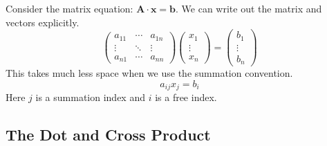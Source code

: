 \begin{Example}
Consider the matrix equation: $\mathbf{A} \cdot \mathbf{x} = \mathbf{b}$.
We can write out the matrix and vectors explicitly.
\[
\begin{pmatrix}
a_{11} & \cdots & a_{1 n} \\
\vdots & \ddots & \vdots \\
a_{n 1} & \cdots & a_{n n}
\end{pmatrix}
\begin{pmatrix}
x_1 \\
\vdots \\
x_n
\end{pmatrix}
=
\begin{pmatrix}
b_1 \\
\vdots \\
b_n
\end{pmatrix}
\]
This takes much less space when we use the summation convention.
\[
a_{i j} x_j = b_i
\]
Here $j$ is a summation index and $i$ is a free index.
\end{Example}










\subsection{The Dot and Cross Product}



